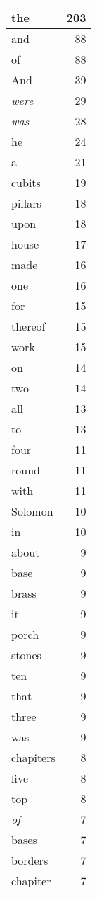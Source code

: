 \begin{center}
\begin{longtable}{l|r}
\hline \hline
\endlastfoot
the & 203 \\ \hline
and & 88 \\ \hline
of & 88 \\ \hline
And & 39 \\ \hline
\emph{were} & 29 \\ \hline
\emph{was} & 28 \\ \hline
he & 24 \\ \hline
a & 21 \\ \hline
cubits & 19 \\ \hline
pillars & 18 \\ \hline
upon & 18 \\ \hline
house & 17 \\ \hline
made & 16 \\ \hline
one & 16 \\ \hline
for & 15 \\ \hline
thereof & 15 \\ \hline
work & 15 \\ \hline
on & 14 \\ \hline
two & 14 \\ \hline
all & 13 \\ \hline
to & 13 \\ \hline
four & 11 \\ \hline
round & 11 \\ \hline
with & 11 \\ \hline
Solomon & 10 \\ \hline
in & 10 \\ \hline
about & 9 \\ \hline
base & 9 \\ \hline
brass & 9 \\ \hline
it & 9 \\ \hline
porch & 9 \\ \hline
stones & 9 \\ \hline
ten & 9 \\ \hline
that & 9 \\ \hline
three & 9 \\ \hline
was & 9 \\ \hline
chapiters & 8 \\ \hline
five & 8 \\ \hline
top & 8 \\ \hline
\emph{of} & 7 \\ \hline
bases & 7 \\ \hline
borders & 7 \\ \hline
chapiter & 7 \\ \hline

\end{longtable}
\end{center}
